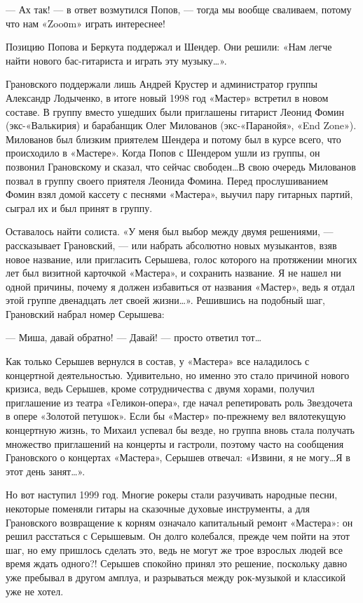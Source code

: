 \documentclass[16pt,a5paper,oneside]{book}
\begin{document}
— Ах так! — в ответ возмутился Попов, — тогда мы вообще сваливаем, потому что нам «Zooоm» играть интереснее!

Позицию Попова и Беркута поддержал и Шендер. Они решили: «Нам легче найти нового бас-гитариста и играть эту
музыку\ldots».

Грановского поддержали лишь Андрей Крустер и администратор группы Александр Лодыченко, в итоге новый 1998 год «Мастер»
встретил в новом составе. В группу вместо ушедших были приглашены гитарист Леонид Фомин (экс-«Валькирия) и барабанщик
Олег Милованов (экс-«Паранойя», «End Zone»). Милованов был близким приятелем Шендера и потому был в курсе всего, что
происходило в «Мастере». Когда Попов с Шендером ушли из группы, он позвонил Грановскому и сказал, что сейчас
свободен\ldots В свою очередь Милованов позвал в группу своего приятеля Леонида Фомина. Перед прослушиванием Фомин взял
домой кассету с песнями «Мастера», выучил пару гитарных партий, сыграл их и был принят в группу.

Оставалось найти солиста. «У меня был выбор между двумя решениями, — рассказывает Грановский, — или набрать абсолютно
новых музыкантов, взяв новое название, или пригласить Серышева, голос которого на протяжении многих лет был визитной
карточкой «Мастера», и сохранить название. Я не нашел ни одной причины, почему я должен избавиться от названия «Мастер»,
ведь я отдал этой группе двенадцать лет своей жизни\ldots». Решившись на подобный шаг, Грановский набрал номер Серышева:

— Миша, давай обратно!
— Давай! — просто ответил тот\ldots

Как только Серышев вернулся в состав, у «Мастера» все наладилось с концертной деятельностью. Удивительно, но именно это
стало причиной нового кризиса, ведь Серышев, кроме сотрудничества с двумя хорами, получил приглашение из театра
«Геликон-опера», где начал репетировать роль Звездочета в опере «Золотой петушок». Если бы «Мастер» по-прежнему вел
вялотекущую концертную жизнь, то Михаил успевал бы везде, но группа вновь стала получать множество приглашений на
концерты и гастроли, поэтому часто на сообщения Грановского о концертах «Мастера», Серышев отвечал: «Извини, я не
могу\ldots Я в этот день занят\ldots».

Но вот наступил 1999 год. Многие рокеры стали разучивать народные песни, некоторые поменяли гитары на сказочные духовые
инструменты, а для Грановского возвращение к корням означало капитальный ремонт «Мастера»: он решил расстаться с
Серышевым. Он долго колебался, прежде чем пойти на этот шаг, но ему пришлось сделать это, ведь не могут же трое взрослых
людей все время ждать одного?! Серышев спокойно принял это решение, поскольку давно уже пребывал в другом амплуа, и
разрываться между рок-музыкой и классикой уже не хотел.
\end{document}
